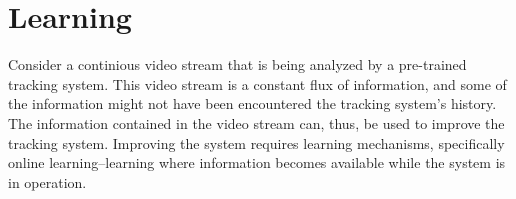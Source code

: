 \section{Learning}
  Consider a continious video stream that is being analyzed by a pre-trained tracking system.
  This video stream is a constant flux of information, and some of the information might not have been encountered the tracking system's history.
  The information contained in the video stream can, thus, be used to improve the tracking system.
  Improving the system requires learning mechanisms, specifically online learning--learning where information becomes available while the system is in operation.
  
  
  
  
